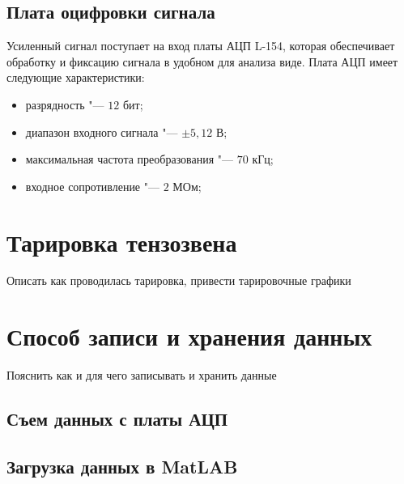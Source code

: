 \subsection{Плата оцифровки сигнала}\label{subsect2_4_3}

Усиленный сигнал поступает на вход платы АЦП L-154, которая обеспечивает обработку и фиксацию сигнала в удобном для анализа виде. Плата АЦП имеет следующие характеристики:
\begin{itemize}
	\item разрядность "--- $12$ бит;
	\item диапазон входного сигнала "--- $\pm5,12$ В;
	\item максимальная частота преобразования "--- $70$ кГц;
	\item входное сопротивление "--- $2$ МОм;
\end{itemize}


\section{Тарировка тензозвена}\label{sect2_5}

Описать как проводилась тарировка, привести тарировочные графики

\section{Способ записи и хранения данных}\label{sect2_6}

Пояснить как и для чего записывать и хранить данные

\subsection{Съем данных с платы АЦП}\label{subsect2_6_1}

\subsection{Загрузка данных в MatLAB}\label{subsect2_6_2}

